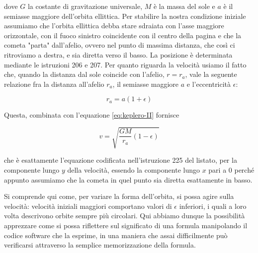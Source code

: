 dove $G$ la costante di gravitazione universale, $M$ è la massa del sole e $a$ è il semiasse maggiore dell'orbita ellittica. Per stabilire la nostra condizione iniziale assumiamo che l'orbita ellittica debba stare sdraiata con l'asse maggiore orizzontale, con il fuoco sinistro coincidente con il centro della pagina e che la cometa "parta" dall'afelio, ovvero nel punto di massima distanza, che così ci ritroviamo a destra, e sia diretta verso il basso. La posizione è determinata mediante le istruzioni 206 e 207. Per quanto riguarda la velocità usiamo il fatto che, quando la distanza dal sole coincide con l'afelio, $r=r_a$, vale la seguente relazione fra la distanza all'afelio $r_a$, il semiasse maggiore $a$ e l'eccentricità $\epsilon$:

\begin{equation}
r_a=a(1+\epsilon) 
\end{equation}

Questa, combinata con l'equazione \ref{eq:keplero-II} fornisce

\begin{equation}
v=\sqrt{\frac{GM}{r_a}(1-\epsilon)}
\end{equation}

che è esattamente l'equazione codificata nell'istruzione 225 del listato, per la componente lungo $y$ della velocità, essendo la componente lungo $x$ pari a 0 perché appunto assumiamo che la cometa in quel punto sia diretta esattamente in basso.

Si comprende qui come, per variare la forma dell'orbita, si possa agire sulla velocità: velocità iniziali maggiori comportano valori di $\epsilon$ inferiori, i quali a loro volta descrivono orbite sempre più circolari. Qui abbiamo dunque la possibilità apprezzare come si possa riflettere sul significato di una formula manipolando il codice software che la esprime, in una maniera che assai difficilmente può verificarsi attraverso la semplice memorizzazione della formula.

